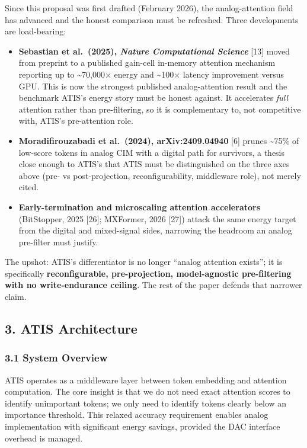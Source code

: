 Since this proposal was first drafted (February 2026), the
analog-attention field has advanced and the honest comparison must be
refreshed. Three developments are load-bearing:

\begin{itemize}
\tightlist
\item
  \textbf{Sebastian et al.~(2025), \emph{Nature Computational Science}}
  {[}13{]} moved from preprint to a published gain-cell in-memory
  attention mechanism reporting up to \textasciitilde70,000× energy and
  \textasciitilde100× latency improvement versus GPU. This is now the
  strongest published analog-attention result and the benchmark ATIS's
  energy story must be honest against. It accelerates \emph{full}
  attention rather than pre-filtering, so it is complementary to, not
  competitive with, ATIS's pre-attention role.
\item
  \textbf{Moradifirouzabadi et al.~(2024), arXiv:2409.04940} {[}6{]}
  prunes \textasciitilde75\% of low-score tokens in analog CIM with a
  digital path for survivors, a thesis close enough to ATIS's that ATIS
  must be distinguished on the three axes above (pre- vs
  post-projection, reconfigurability, middleware role), not merely
  cited.
\item
  \textbf{Early-termination and microscaling attention accelerators}
  (BitStopper, 2025 {[}26{]}; MXFormer, 2026 {[}27{]}) attack the same
  energy target from the digital and mixed-signal sides, narrowing the
  headroom an analog pre-filter must justify.
\end{itemize}

The upshot: ATIS's differentiator is no longer ``analog attention
exists''; it is specifically \textbf{reconfigurable, pre-projection,
model-agnostic pre-filtering with no write-endurance ceiling}. The rest
of the paper defends that narrower claim.

\subsection{3. ATIS Architecture}\label{atis-architecture}

\subsubsection{3.1 System Overview}\label{system-overview}

ATIS operates as a middleware layer between token embedding and
attention computation. The core insight is that we do not need exact
attention scores to identify unimportant tokens; we only need to
identify tokens clearly below an importance threshold. This relaxed
accuracy requirement enables analog implementation with significant
energy savings, provided the DAC interface overhead is managed.

